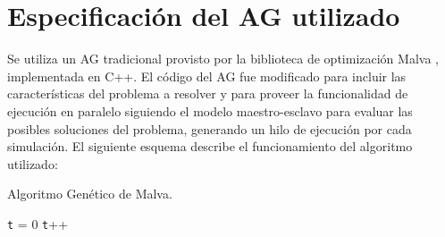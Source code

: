 \section{Especificación del AG utilizado}

Se utiliza un AG tradicional \citep{Goldberg1989} provisto por la biblioteca de optimización Malva \citep{Malva}, implementada en C++. El código del AG fue modificado para incluir las características del problema a resolver y para proveer la funcionalidad de ejecución en paralelo siguiendo el modelo maestro-esclavo para evaluar
las posibles soluciones del problema, generando un hilo de ejecución por cada simulación. El siguiente esquema describe el funcionamiento del algoritmo utilizado:

\begin{algorithm}[H]
	\caption{Algoritmo Genético de Malva. }
	\label{alg:algoritmo_genetico_malva}
	\begin{algorithmic} [1] 
		{
			\STATE \texttt{t} = 0
			\STATE \texttt{t}++		
			\ENDWHILE
		}
	\end{algorithmic}
	
\end{algorithm}

